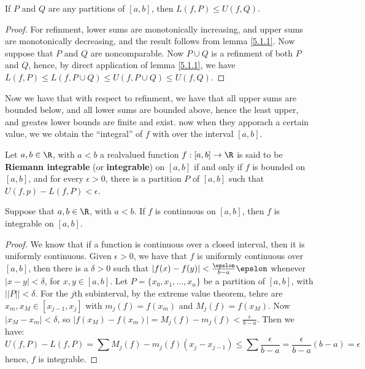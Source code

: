 \begin{lemma}\label{5.1.2}
    If $P$ and  $Q$ are any partitions of  $[a,b]$, then  $L(f,P) \leq U(f,Q)$.
\end{lemma}
\begin{proof}
    For refinment, lower sums are monotonically increasing, and upper sums are monotonically decreasing, and the result follows from lemma \ref{5.1.1}. Now suppose that $P$ and  $Q$ are noncomparable. Now $P \cup Q$ is a refinment of both  $P$ and  $Q$, hence, by direct application of lemma \ref{5.1.1}, we have $L(f,P) \leq L(f,P \cup Q) \leq U(f,P \cup Q) \leq U(f,Q)$.
\end{proof}
\begin{remark} 
    Now we have that with respect to refinment, we have that all upper sums are bounded below, and all lower sums are bounded above, hence the least upper, and greates lower bounds are finite and exist.
    now when they apporach a certain value, we we obtain the ``integral'' of $f$ with  over the interval $[a,b].$
\end{remark}

\begin{definition}
    Let $a,b \in \R$, with  $a<b$ a realvalued function $f:[a,b] \rightarrow \R$ is said to be \textbf{Riemann integrable} (or \textbf{integrable}) on $[a,b]$ if and only if  $f$ is bounded on  $[a,b]$, and for every  $\epsilon>0$, there is a partition  $P$ of $[a,b]$ such that  $U(f,p)-L(f,P)<\epsilon$.
\end{definition}

\begin{theorem}\label{5.1.3}
    Suppose that $a,b \in \R$, with  $a<b$. If  $f$ is continuous on  $[a,b]$, then  $f$ is integrable on  $[a,b]$.
\end{theorem}
\begin{proof}
    We know that if a function is continuous over a closed interval, then it is uniformly continuous.
    Given  $\epsilon>0$, we have that  $f$ is uniformly continuous over  $[a,b]$, then there is a  $\delta>0$ such that $|f(x)-f(y)|<\frac{\epslon}{b-a}\epslon$ whenever $|x-y|<\delta$, for  $x,y \in [a,b]$.
    Let $P=\{x_0,x_1, \dots, x_n\}$ be a partition of $[a,b]$, with  $||P||<\delta$. For the  $j$th subinterval, by the extreme value theorem, tehre are $x_m, x_M \in [x_{j-1},x_j]$ with $m_j(f)=f(x_m)$ and  $M_j(f)=f(x_M)$.
    Now  $|x_M-x_m|<\delta$, so  $|f(x_M)-f(x_m)|=M_j(f)-m_j(f)<\frac{\epsilon}{b-a}$.
    Then we have:
        \begin{equation*}
            U(f,P)-L(f,P)=\sum{M_j(f)-m_j(f)(x_j-x_{j-1})} \leq \sum{\frac{\epsilon}{b-a}}=\frac{\epsilon}{b-a}(b-a)=\epsilon
        \end{equation*} 
hence, $f$ is integrable.
\end{proof}

